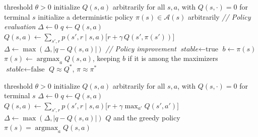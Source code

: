 \documentclass[letterpaper, 11pt]{article}
\newcommand{\1}{\mathds{1}}	%
\DeclareMathOperator*{\argmax}{argmax}    %
\theoremstyle{definition}
\begin{document}
\begin{algorithm}[tbp]
\caption{Policy iteration with $Q$ (estimates $\pi \approx \pi^*$)}
\begin{algorithmic}[1]
\Require threshold $\theta > 0$
\State initialize $Q(s, a)$ arbitrarily for all $s, a$, with $Q(s, \cdot) = 0$ for terminal $s$
\State initialize a deterministic policy $\pi(s) \in \mathcal{A}(s)$ arbitrarily
\Loop
  \State \textit{// Policy evaluation}
  \Repeat
    \State $\Delta \gets 0$
      \State $q \gets Q(s, a)$
      \State $Q(s, a) \gets \sum_{s', r} p(s', r \mid s, a) \big[ r + \gamma\, Q(s', \pi(s')) \big]$
      \State $\Delta \gets \max(\Delta, |q - Q(s, a)|)$
    \EndFor
  \Until{$\Delta < \theta$}
  \State \textit{// Policy improvement}
  \State $\textit{stable} \gets \text{true}$
    \State $b \gets \pi(s)$
    \State $\pi(s) \gets \argmax_a Q(s, a)$, keeping $b$ if it is among the maximizers
     $\textit{stable} \gets \text{false}$ \EndIf
  \EndFor
   \Return $Q \approx Q^*$, $\pi \approx \pi^*$ \EndIf
\EndLoop
\end{algorithmic}
\end{algorithm}

\begin{algorithm}[tbp]
\caption{Value iteration with $Q$ (estimates $Q \approx Q^*$ and $\pi \approx \pi^*$)}
\begin{algorithmic}[1]
\Require threshold $\theta > 0$
\State initialize $Q(s, a)$ arbitrarily for all $s, a$, with $Q(s, \cdot) = 0$ for terminal $s$
\Repeat
  \State $\Delta \gets 0$
    \State $q \gets Q(s, a)$
    \State $Q(s, a) \gets \sum_{s', r} p(s', r \mid s, a) \big[ r + \gamma \max_{a'} Q(s', a') \big]$
    \State $\Delta \gets \max(\Delta, |q - Q(s, a)|)$
  \EndFor
\Until{$\Delta < \theta$}
\State \Return $Q$ and the greedy policy $\pi(s) = \argmax_a Q(s, a)$
\end{algorithmic}
\end{algorithm}
\end{document}
